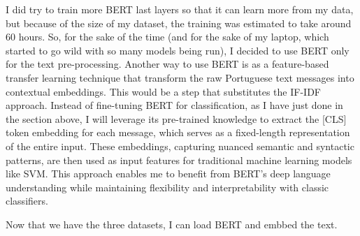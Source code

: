 \documentclass[11pt]{article}
\begin{document}
I did try to train more BERT last layers so that it can learn more from
my data, but because of the size of my dataset, the training was
estimated to take around 60 hours. So, for the sake of the time (and for
the sake of my laptop, which started to go wild with so many models
being run), I decided to use BERT only for the text pre-processing.
Another way to use BERT is as a feature-based transfer learning
technique that transform the raw Portuguese text messages into
contextual embeddings. This would be a step that substitutes the IF-IDF
approach. Instead of fine-tuning BERT for classification, as I have just
done in the section above, I will leverage its pre-trained knowledge to
extract the {[}CLS{]} token embedding for each message, which serves as
a fixed-length representation of the entire input. These embeddings,
capturing nuanced semantic and syntactic patterns, are then used as
input features for traditional machine learning models like SVM. This
approach enables me to benefit from BERT's deep language understanding
while maintaining flexibility and interpretability with classic
classifiers.

    Now that we have the three datasets, I can load BERT and embbed the
text.
\end{document}
